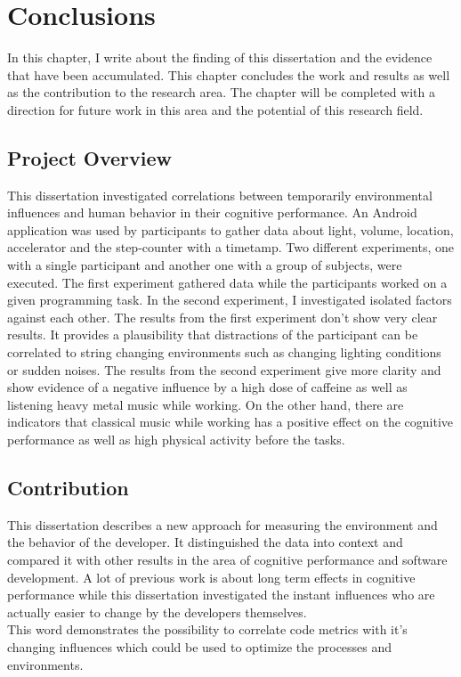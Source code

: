 \chapter{Conclusions}
In this chapter, I write about the finding of this dissertation and the evidence that have been accumulated. This chapter concludes the work and results as well as the contribution to the research area. 
The chapter will be completed with a direction for future work in this area and the potential of this research field. 

\section{Project Overview}
This dissertation investigated correlations between temporarily environmental influences and human behavior in their cognitive performance. 
An Android application was used by participants to gather data about light, volume, location, accelerator and the step-counter with a timetamp.  
Two different experiments, one with a single participant and another one with a group of subjects, were executed. The first experiment gathered data while the participants worked on a given programming task. In the second experiment, I investigated isolated factors against each other.
The results from the first experiment don't show very clear results. It provides a plausibility that distractions of the participant can be correlated to string changing environments such as changing lighting conditions or sudden noises. 
The results from the second experiment give more clarity and show evidence of a negative influence by a high dose of caffeine as well as listening heavy metal music while working. On the other hand, there are indicators that classical music while working has a positive effect on the cognitive performance  as well as high physical activity before the tasks. 

\section{Contribution}
This dissertation describes a new approach for measuring the environment and the behavior of the developer. It distinguished the data into context and compared it with other results in the area of cognitive performance and software development. A lot of previous work is about long term effects in cognitive performance while this dissertation investigated the instant influences who are actually easier to change by the developers themselves. \\
This word demonstrates the possibility to correlate code metrics with it's changing influences which could be used to optimize the processes and environments. 

